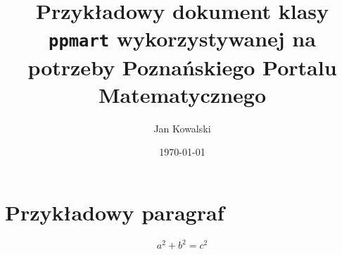 \documentclass[lineno]{ppmart}
\title{Przykładowy dokument klasy \texttt{ppmart} wykorzystywanej na potrzeby Poznańskiego Portalu Matematycznego}
\author{Jan Kowalski}
\date{\today}
\begin{document}
\maketitle

\section{Przykładowy paragraf}

\lipsum[1-2]

$$a^2 + b^2 = c^2$$

\lipsum[3]
\end{document}
